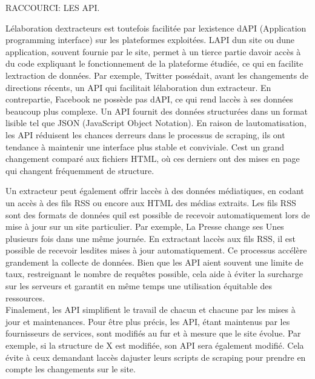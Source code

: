 \documentclass[
  letterpaper,
  DIV=11,
  numbers=noendperiod]{scrreprt}
\begin{document}
RACCOURCI: LES API.

L\textquotesingle élaboration d\textquotesingle extracteurs est
toutefois facilitée par l\textquotesingle existence
d\textquotesingle API (Application programming interface) sur les
plateformes exploitées. L\textquotesingle API d\textquotesingle un site
ou d\textquotesingle une application, souvent fournie par le site,
permet à un tierce partie d\textquotesingle avoir accès à du code
expliquant le fonctionnement de la plateforme étudiée, ce qui en
facilite l\textquotesingle extraction de données. Par exemple, Twitter
possédait, avant les changements de directions récents, un API qui
facilitait l\textquotesingle élaboration d\textquotesingle un
extracteur. En contrepartie, Facebook ne possède pas
d\textquotesingle API, ce qui rend l\textquotesingle accès à ses données
beaucoup plus complexe. Un API fournit des données structurées dans un
format lisible tel que JSON (JavaScript Object Notation). En raison de
l\textquotesingle automatisation, les API réduisent les chances
d\textquotesingle erreurs dans le processus de scraping, ils ont
tendance à maintenir une interface plus stable et conviviale.
C\textquotesingle est un grand changement comparé aux fichiers HTML, où
ces derniers ont des mises en page qui changent fréquemment de
structure.

Un extracteur peut également offrir l\textquotesingle accès à des
données médiatiques, en codant un accès à des fils RSS ou encore aux
HTML des médias extraits. Les fils RSS sont des formats de données
qu\textquotesingle il est possible de recevoir automatiquement lors de
mise à jour sur un site particulier. Par exemple, La Presse change ses
Unes plusieurs fois dans une même journée. En extractant
l\textquotesingle accès aux fils RSS, il est possible de recevoir
lesdites mises à jour automatiquement. Ce processus accélère grandement
la collecte de données. Bien que les API aient souvent une limite de
taux, restreignant le nombre de requêtes possible, cela aide à éviter la
surcharge sur les serveurs et garantit en même temps une utilisation
équitable des ressources.\\

Finalement, les API simplifient le travail de chacun et chacune par les
mises à jour et maintenances. Pour être plus précis, les API, étant
maintenus par les fournisseurs de services, sont modifiés au fur et à
mesure que le site évolue. Par exemple, si la structure de X est
modifiée, son API sera également modifié. Cela évite à ceux demandant
l\textquotesingle accès d\textquotesingle ajuster leurs scripts de
scraping pour prendre en compte les changements sur le site.
\end{document}
